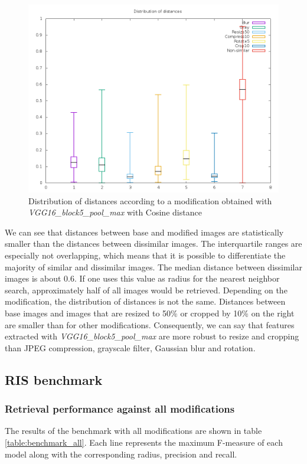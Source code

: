 \begin{figure}
	\includegraphics[width=\textwidth]{img/distributions_VGG16_block5_pool_max_cosine.png}
	\caption{Distribution of distances according to a modification obtained with \textit{VGG16\_block5\_pool\_max} with Cosine distance}
	\label{fig:distributions_VGG16_block5_pool_max_cosine}
\end{figure}

We can see that distances between base and modified images are statistically smaller than the distances between dissimilar images. The interquartile ranges are especially not overlapping, which means that it is possible to differentiate the majority of similar and dissimilar images. The median distance between dissimilar images is about 0.6. If one uses this value as radius for the nearest neighbor search, approximately half of all images would be retrieved. Depending on the modification, the distribution of distances is not the same. Distances between base images and images that are resized to 50\% or cropped by 10\% on the right are smaller than for other modifications. Consequently, we can say that features extracted with \textit{VGG16\_block5\_pool\_max} are more robust to resize and cropping than JPEG compression, grayscale filter, Gaussian blur and rotation.

\subsection{RIS benchmark}

\subsubsection{Retrieval performance against all modifications}
The results of the benchmark with all modifications are shown in table \ref{table:benchmark_all}. Each line represents the maximum F-measure of each model along with the corresponding radius, precision and recall.

